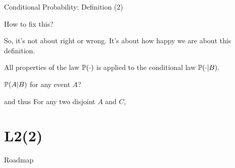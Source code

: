 \documentclass[fleqn,aspectratio=169]{beamer}
\begin{document}
\begin{frame}{Conditional Probability: Definition (2)}

\plitemsep 0.1in
\bci 

\item<1-> How to fix this?  
\item So, it's not about right or wrong. It's about how happy we are about this definition. 
\eci

\item<4-> All properties of the law $\mathbb{P}( \cdot )$ is applied to the conditional law $\mathbb{P}( \cdot | B ).$ 
\bci
\item<5->  $\mathbb{P}( A | B )$ for any event $A$?
\item<6->  and thus  For any two disjoint  $A$ and $C$,
\eci




\eci 

\end{frame}



\section{L2(2)}
\begin{frame}{Roadmap}

\bce[(1)]
\item {}

\item {}

\item {}

\ece
\end{frame}
\end{document}
